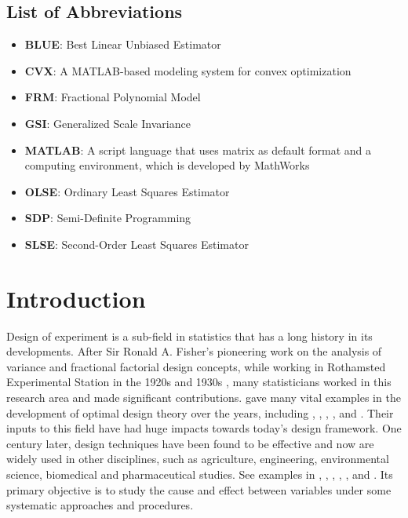 \documentclass[
]{book}
\providecommand{\tightlist}{%
  \setlength{\itemsep}{0pt}\setlength{\parskip}{0pt}}
\theoremstyle{definition}
\theoremstyle{definition}
\theoremstyle{definition}
\theoremstyle{definition}
\theoremstyle{remark}
\begin{document}
\section{List of Abbreviations}\label{list-of-abbreviations}

\begin{itemize}
\tightlist
\item
  \textbf{BLUE}: Best Linear Unbiased Estimator
\item
  \textbf{CVX}: A MATLAB-based modeling system for convex optimization
\item
  \textbf{FRM}: Fractional Polynomial Model
\item
  \textbf{GSI}: Generalized Scale Invariance
\item
  \textbf{MATLAB}: A script language that uses matrix as default format and a computing environment, which is developed by MathWorks
\item
  \textbf{OLSE}: Ordinary Least Squares Estimator
\item
  \textbf{SDP}: Semi-Definite Programming
\item
  \textbf{SLSE}: Second-Order Least Squares Estimator
\end{itemize}

\chapter{Introduction}\label{intro}

Design of experiment is a sub-field in statistics that has a long history in its developments. After Sir Ronald A. Fisher's pioneering work on the analysis of variance and fractional factorial design concepts, while working in Rothamsted Experimental Station in the 1920s and 1930s \citep[p.~21]{montgomery2012introduction}, many statisticians worked in this research area and made significant contributions. \citet{berger2009introduction} gave many vital examples in the development of optimal design theory over the years, including \citet{chernoff1953locally}, \citet{kiefer1959optimum}, \citet{kiefer1974general}, \citet{kiefer-wolfowitz1959optimum}, \citet{silvey1980optimal} and \citet{atkinson1992optimum}. Their inputs to this field have had huge impacts towards today's design framework. One century later, design techniques have been found to be effective and now are widely used in other disciplines, such as agriculture, engineering, environmental science, biomedical and pharmaceutical studies. See examples in \citet{crary2000optimal}, \citet{crary2002design}, \citet{haines2003bayesian}, \citet{zhou2003a}, \citet{jain2003modeling}, \citet{brosi2008optimal} and \citet{schorning2017optimal}. Its primary objective is to study the cause and effect between variables under some systematic approaches and procedures.
\end{document}
